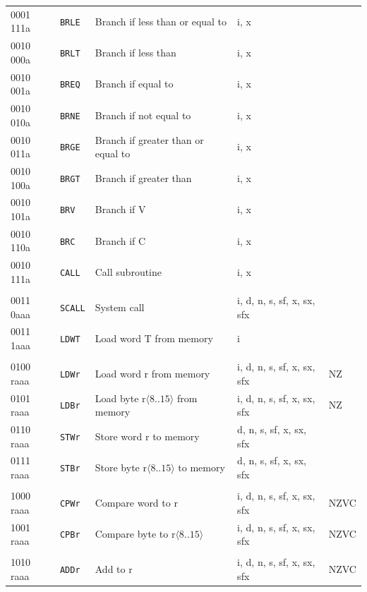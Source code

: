 \documentclass[10pt,fleqn]{book}
\begin{document}
\begin{tabular}{ l l l l l }
0001 111a   & \verb|BRLE|    & Branch if less than or equal to             & i, x \\ 
0010 000a   & \verb|BRLT|    & Branch if less than                         & i, x \\
0010 001a   & \verb|BREQ|    & Branch if equal to                          & i, x \\ 
0010 010a   & \verb|BRNE|    & Branch if not equal to                      & i, x \\ 
0010 011a   & \verb|BRGE|    & Branch if greater than or equal to          & i, x \\ 
0010 100a   & \verb|BRGT|    & Branch if greater than                      & i, x \\ 
0010 101a   & \verb|BRV|     & Branch if V                                 & i, x \\ 
0010 110a   & \verb|BRC|     & Branch if C                                 & i, x \\ 
0010 111a   & \verb|CALL|    & Call subroutine                             & i, x \\ 
 \\
0011 0aaa   & \verb|SCALL|   & System call                                 & i, d, n, s, sf, x, sx, sfx \\
0011 1aaa   & \verb|LDWT|    & Load word T from memory                     & i \\
 \\
0100 raaa   & \verb|LDWr|    & Load word r from memory                     & i, d, n, s, sf, x, sx, sfx  & NZ \\
0101 raaa   & \verb|LDBr|    & Load byte r$\langle8..15\rangle$ from memory& i, d, n, s, sf, x, sx, sfx  & NZ \\
0110 raaa   & \verb|STWr|    & Store word r to memory                      & d, n, s, sf, x, sx, sfx \\
0111 raaa   & \verb|STBr|    & Store byte r$\langle8..15\rangle$ to memory & d, n, s, sf, x, sx, sfx \\
\\
1000 raaa   & \verb|CPWr|    & Compare word to r                           & i, d, n, s, sf, x, sx, sfx  & NZVC \\
1001 raaa   & \verb|CPBr|    & Compare byte to r$\langle8..15\rangle$      & i, d, n, s, sf, x, sx, sfx  & NZVC \\
 \\
1010 raaa   & \verb|ADDr|    & Add to r                                    & i, d, n, s, sf, x, sx, sfx  & NZVC \\

\end{tabular}
\end{document}
